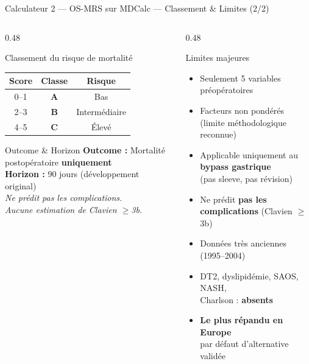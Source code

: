 \documentclass[aspectratio=169]{beamer}
\newcommand{\tightlist}{%
  \setlength{\itemsep}{1pt}\setlength{\parskip}{0pt}%
  \setlength{\parsep}{0pt}\setlength{\topsep}{2pt}}
\begin{document}
\begin{frame}{Calculateur 2 --- OS-MRS sur MDCalc --- Classement \& Limites (2/2)}
  \begin{columns}[T]
    \begin{column}{0.48\textwidth}
      \begin{block}{Classement du risque de mortalité}
        \footnotesize
        \begin{tabular}{ccc}
          \toprule
          \textbf{Score} & \textbf{Classe} & \textbf{Risque} \\
          \midrule
          0--1 & \textcolor{vertdoux}{\textbf{A}}     & \textcolor{vertdoux}{Bas} \\
          2--3 & \textcolor{orangemod}{\textbf{B}}    & \textcolor{orangemod}{Intermédiaire} \\
          4--5 & \textcolor{rougealerte}{\textbf{C}}  & \textcolor{rougealerte}{Élevé} \\
          \bottomrule
        \end{tabular}
      \end{block}
      \vspace{0.4em}
      \begin{block}{Outcome \& Horizon}
        \footnotesize
        \textbf{Outcome :} Mortalité postopératoire \textbf{uniquement}\\[4pt]
        \textbf{Horizon :} 90 jours (développement original)\\[4pt]
        \textcolor{rougealerte}{\textit{Ne prédit pas les complications.\\
        Aucune estimation de Clavien $\geq$3b.}}
      \end{block}
    \end{column}
    \begin{column}{0.48\textwidth}
      \begin{alertblock}{Limites majeures}
        \footnotesize\tightlist
        \begin{itemize}\tightlist
          \item Seulement 5 variables préopératoires
          \item Facteurs non pondérés\\
                (limite méthodologique reconnue)
          \item Applicable uniquement au \textbf{bypass gastrique}\\
                (pas sleeve, pas révision)
          \item Ne prédit \textbf{pas les complications} (Clavien $\geq$3b)
          \item Données très anciennes (1995--2004)
          \item DT2, dyslipidémie, SAOS, NASH,\\
                Charlson : \textbf{absents}
          \item \textbf{Le plus répandu en Europe}\\
                par défaut d'alternative validée
        \end{itemize}
      \end{alertblock}
    \end{column}
  \end{columns}
\end{frame}
\end{document}

